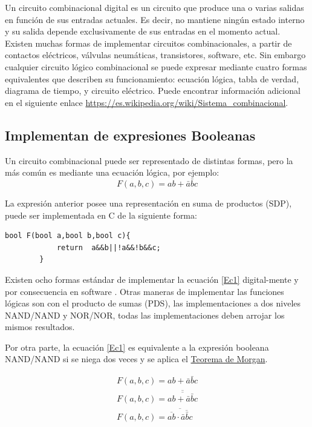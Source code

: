 Un circuito combinacional digital es un circuito que produce una o varias salidas en función de sus entradas actuales. Es decir, no mantiene ningún estado interno y su salida depende exclusivamente de sus entradas en el momento actual.
Existen muchas formas de implementar circuitos combinacionales, a partir de contactos eléctricos, válvulas neumáticas, transistores, software, etc. Sin embargo cualquier circuito lógico combinacional se puede expresar mediante cuatro formas equivalentes que describen su funcionamiento: ecuación lógica, tabla de verdad, diagrama de tiempo, y circuito eléctrico. 
Puede encontrar información adicional en el siguiente enlace \href{https://es.wikipedia.org/wiki/Sistema_combinacional}{https://es.wikipedia.org/wiki/Sistema\_combinacional}.   

\subsection{Implementan de expresiones Booleanas }

Un circuito combinacional  puede ser representado de distintas formas, pero la más común es mediante una ecuación lógica, por ejemplo: 
\begin{equation}
\label{Ec1}
F(a,b,c)=ab+\bar{a}\bar{b}c
\end{equation}

La expresión anterior posee una representación en suma de productos (SDP), puede ser implementada en C de la siguiente forma:

		 \begin{lstlisting}[language=Arduino,numbers=none, showstringspaces=false]
		bool F(bool a,bool b,bool c){
			return  a&&b||!a&&!b&&c;
		}
		\end{lstlisting} 

Existen ocho formas estándar de implementar la ecuación \eqref{Ec1} digital-mente y por consecuencia en software . Otras maneras de implementar las funciones lógicas  son con el producto de sumas (PDS), las implementaciones a dos niveles  NAND/NAND y NOR/NOR, todas las implementaciones deben arrojar los mismos resultados.

Por otra parte, la ecuación \eqref{Ec1} es equivalente a la expresión booleana  NAND/NAND si se niega dos veces y se aplica el \href{https://es.wikipedia.org/wiki/Leyes_de_De_Morgan}{Teorema de Morgan}.


\begin{eqnarray}
\label{Ec2}
F(a,b,c)=ab+\bar{a}\bar{b}c \\
F(a,b,c)=\overline{\overline{ab+\bar{a}\bar{b}c }} \\  \label{Ec3}
F(a,b,c)=\overline{\overline{ab}\cdot\overline{\bar{a}\bar{b}c}}
\end{eqnarray}


